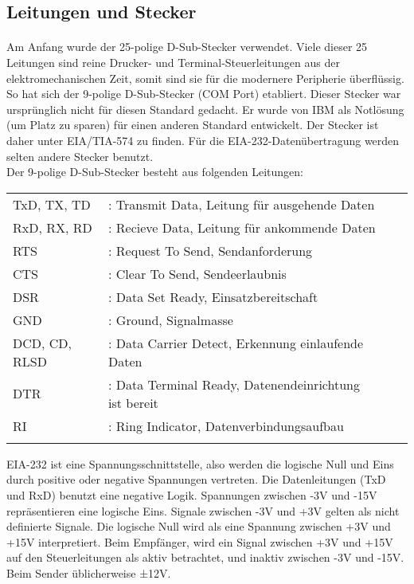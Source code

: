 \subsection{Leitungen und Stecker}
\paragraph{}
Am Anfang wurde der 25-polige D-Sub-Stecker verwendet. Viele dieser 25 Leitungen sind reine Drucker- und Terminal-Steuerleitungen aus der elektromechanischen Zeit, somit sind sie für die modernere Peripherie überflüssig. So hat sich der 9-polige D-Sub-Stecker (COM Port) etabliert. Dieser Stecker war ursprünglich nicht für diesen Standard gedacht. Er wurde von IBM als Notlösung (um Platz zu sparen) für einen anderen Standard entwickelt. Der Stecker ist daher unter EIA/TIA-574 zu finden. Für die EIA-232-Datenübertragung werden selten andere Stecker benutzt.
\\
Der 9-polige D-Sub-Stecker besteht aus folgenden Leitungen:\\
\begin{tabular}{llll}
\\
TxD, TX, TD &: Transmit Data, Leitung für ausgehende Daten \\
RxD, RX, RD &: Recieve Data, Leitung für ankommende Daten \\
RTS &: Request To Send, Sendanforderung \\
CTS &: Clear To Send, Sendeerlaubnis \\
DSR &: Data Set Ready, Einsatzbereitschaft \\
GND &: Ground, Signalmasse \\
DCD, CD, RLSD &: Data Carrier Detect, Erkennung einlaufende Daten \\
DTR &: Data Terminal Ready, Datenendeinrichtung ist bereit \\
RI &: Ring Indicator, Datenverbindungsaufbau \\\\
\end{tabular}


EIA-232 ist eine Spannungsschnittstelle, also werden die logische Null und Eins durch positive oder negative Spannungen vertreten. Die Datenleitungen (TxD und RxD) benutzt eine negative Logik. Spannungen zwischen -3V und -15V repräsentieren eine logische Eins. Signale zwischen -3V und +3V gelten als nicht definierte Signale. Die logische Null wird als eine Spannung zwischen +3V und +15V interpretiert. Beim Empfänger, wird ein Signal zwischen +3V und +15V auf den Steuerleitungen als aktiv betrachtet, und inaktiv zwischen -3V und -15V. Beim Sender üblicherweise ±12V.\\


